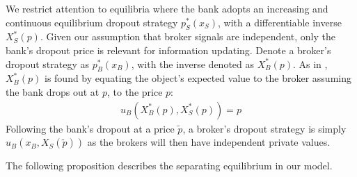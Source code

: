 \documentclass[11pt,twopage]{article}
\newtheorem{assumption}{Assumption}
{\bf}{\it}
\begin{document}
We restrict attention to equilibria where the bank adopts an increasing and continuous equilibrium dropout strategy $p_S^*(x_S)$, with a differentiable inverse $X_S^*(p)$. Given our assumption that broker signals are independent, only the bank's dropout price is relevant for information updating. Denote a broker's dropout strategy as $p_B^*(x_B)$, with the inverse denoted as $X_B^*(p)$. As in \cite{milgrom1982theory}, $X_B^*(p)$  is found by equating the object's expected value to the broker assuming the bank drops out at $p$, to the price $p$:
\begin{align}
u_B(X_B^*(p),X_S^*(p)) = p  \label{eq:ubgen} 
\end{align}
Following the bank's dropout at a price $\tilde p$, a broker's dropout strategy is simply $u_B(x_B,X_S(\tilde p))$ as the brokers will then have independent private values.







The following proposition describes the separating equilibrium in our model.
\end{document}
